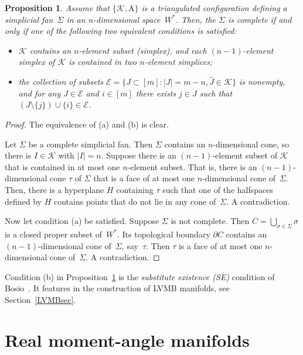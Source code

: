\documentclass[a4paper]{amsart}
\newtheorem{proposition}[theorem]{Proposition}
\theoremstyle{definition}
\theoremstyle{remark}
\numberwithin{equation}{section}
\def\sK{\mathcal K}
\newcommand{\<}{\langle}
\renewcommand{\>}{\rangle}
\begin{document}
\begin{proposition}\label{galecomp}
Assume that $\{\mathcal K,\mathrm A\}$ is a triangulated configuration defining a simplicial fan~$\Sigma$ in an $n$-dimensional space~$W^*$. Then, the $\Sigma$ is complete if and only if one of the following two equivalent conditions is satisfied:
\begin{itemize}
\item[(a)] $\sK$ contains an $n$-element subset (simplex), and each $(n-1)$-element simplex of $\sK$ is contained in two $n$-element simplices;
\item[(b)] the collection of subsets $\mathcal E=\{J\subset [m]\colon|J|=m-n,\widehat J\in\sK\}$ is nonempty, and for any $J\in\mathcal E$ and $i\in[m]$ there exists $j\in J$ such that $(J\setminus\{j\})\cup\{i\}\in\mathcal E$. 
\end{itemize}
\end{proposition}
\begin{proof}
The equivalence of (a) and (b) is clear.

Let $\Sigma$ be a complete simplicial fan. Then $\Sigma$ contains an $n$-dimensional cone, so there is $I\in\sK$ with $|I|=n$. Suppose there is an $(n-1)$-element subset of $\sK$ that is contained in at most one $n$-element subset. That is, there is an $(n-1)$-dimensional cone $\tau$ of $\Sigma$ that is a face of at most one $n$-dimensional cone of~$\Sigma$. Then, there is a hyperplane $H$ containing $\tau$ such that one of the halfspaces defined by $H$ contains points that do not lie in any cone of~$\Sigma$. A contradiction.

Now let condition (a) be satisfied. Suppose $\Sigma$ is not complete. Then $C=\bigcup_{\sigma\in\Sigma}\sigma$ is a closed proper subset of~$W^*$. Its topological boundary $\partial C$ contains an 
$(n-1)$-dimensional cone of~$\Sigma$, say~$\tau$. Then $\tau$ is a face of at most one $n$-dimensional cone of~$\Sigma$. A contradiction.
\end{proof}

Condition (b) in Proposition~\ref{galecomp} is the \emph{substitute existence (SE)} condition of Bosio~\cite{bosi01}. It features in the construction of LVMB manifolds, see Section~\ref{LVMBsec}.



\section{Real moment-angle manifolds}\label{rksec}
\end{document}
